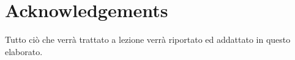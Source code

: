 \chapter{Acknowledgements}
Tutto ciò che verrà trattato a lezione verrà riportato ed addattato in questo elaborato.